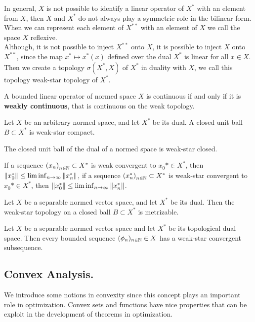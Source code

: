 In general, $X$ is not possible to identify a linear operator of $X^*$ with an element from $X$, then $X$ and $X^*$ do not always play a symmetric role in the bilinear form. When we can represent each element of $X^{**}$ with an element of $X$ we call the space $X$ reflexive.\\

Although, it is not possible to inject $X^{**}$ onto $X$, it is possible to inject $X$ onto $X^{**}$, since the map $x^*\mapsto x^*(x)$ defined over the dual $X^*$ is linear for all $x\in X$. Then we create a topology  $\sigma(X^*, X)$ of $X^*$ in  duality with $X$, we call this topology weak-star topology of $X^*$.

A bounded linear operator of normed space $X$ is continuous if and only if it is \textbf{weakly continuous}, that is continuous on the weak topology.\\
\begin{theorem}
Let $X$ be an arbitrary normed space, and let $X^*$ be its dual. A closed unit ball $B\subset X^*$ is weak-star compact.
\end{theorem}

\begin{corollary}
The closed unit ball of the dual of a normed space is weak-star closed.
\end{corollary}
If a sequence $\left( x_n \right)_{n\in\mathbb{N}}\subset X^*$ is weak convergent to $x_0*\in X^*$, then
$\left\|x^*_0\right\|\leq \liminf_{n\to\infty}\left\|x^*_n\right\|$, if a sequence $\left( x^*_n \right)_{n\in\mathbb{N}}\subset X^*$ is weak-star convergent to $x_0*\in X^*$, then
$\left\|x^*_0\right\|\leq \liminf_{n\to\infty}\left\|x^*_n\right\|$.
\begin{theorem}
Let $X$ be a separable normed vector space, and let $X^*$ be its dual. Then the weak-star topology on a closed ball $B\subset X^*$ is metrizable. 
\end{theorem}
\begin{corollary} Let $X$ be a separable normed vector space and let $X^*$ be its topological dual space. Then every bounded sequence $(\phi_n)_{n\in \mathbb{N}}\in X$ has a weak-star convergent subsequence.
\end{corollary}

\subsection{Convex Analysis.}
We introduce some notions in convexity since this concept plays an important role in optimization. Convex sets and functions have nice properties that can be exploit in the development of theorems in optimization. 
 
